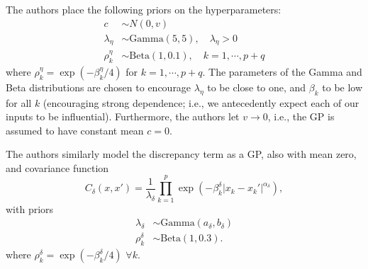 \documentclass{article}
\begin{document}
The authors place the following priors on the hyperparameters:
\begin{equation}
\begin{aligned}
c&\sim N(0,v)\\
\lambda_\eta&\sim \mathrm{Gamma}(5,5),\quad\lambda_\eta>0\\
\rho_k^\eta &\sim \mathrm{Beta}(1,0.1),\quad k=1,\cdots,p+q
\end{aligned}
\end{equation}
where $\rho_k^\eta=\exp(-\beta_k^\eta/4)$ for $k=1,\cdots,p+q$. The parameters of the Gamma and Beta distributions are chosen to encourage $\lambda_\eta$ to be close to one, and $\beta_k$ to be low for all $k$ (encouraging strong dependence; i.e., we antecedently expect each of our inputs to be influential). Furthermore, the authors let $v\to0$, i.e., the GP is assumed to have constant mean $c=0$.

The authors similarly model the discrepancy term as a GP, also with mean zero, and covariance function
\begin{equation}
C_\delta(x,x') = \frac 1{\lambda_\delta} \prod_{k=1}^p
\exp\left( -\beta_k^\delta |x_k-x_k'|^{\alpha_\delta} \right),
\end{equation}
with priors
\begin{equation}
\begin{aligned}
\lambda_\delta &\sim \mathrm{Gamma}(a_\delta,b_\delta)\\
\rho^\delta_k &\sim \mathrm{Beta}(1,0.3).
\end{aligned}
\end{equation}
where $\rho_k^\delta=\exp(-\beta_k^\delta/4)$ $\forall k$.
\end{document}
